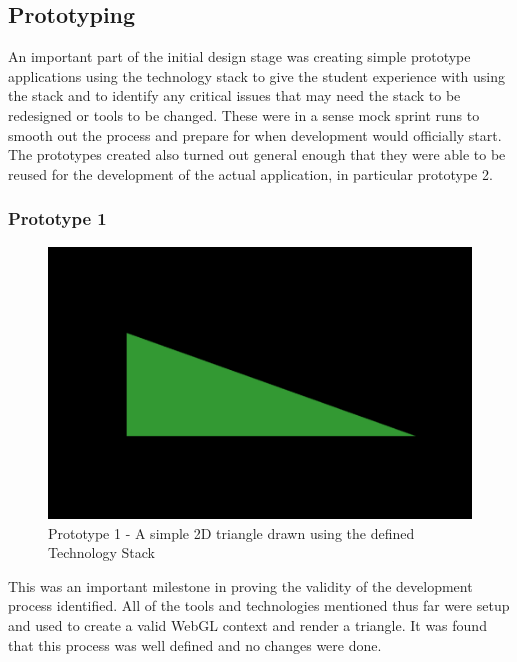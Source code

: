 \subsection{Prototyping}
An important part of the initial design stage was creating simple prototype applications using the technology stack to give the student experience with using the stack and to identify any critical issues that may need the stack to be redesigned or tools to be changed. These were in a sense mock sprint runs to smooth out the process and prepare for when development would officially start. The prototypes created also turned out general enough that they were able to be reused for the development of the actual application, in particular prototype 2.

\subsubsection {Prototype 1}
\begin{figure}[h]
    \centering
    \includegraphics[width=1\columnwidth]{author-files/figures/tri.png}
    \caption{Prototype 1 - A simple 2D triangle drawn using the defined Technology Stack}
    \label{fig:prototype1}
\end{figure}

This was an important milestone in proving the validity of the development process identified. All of the tools and technologies mentioned thus far were setup and used to create a valid WebGL context and render a triangle. It was found that this process was well defined and no changes were done.

